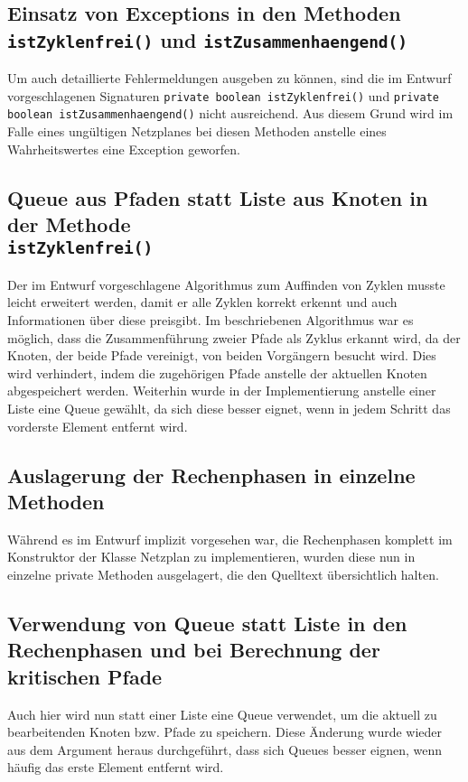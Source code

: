 \subsection{Einsatz von Exceptions in den Methoden
  \texttt{istZyklenfrei()} und \texttt{istZusammenhaengend()}}

Um auch detaillierte Fehlermeldungen ausgeben zu k\"onnen, sind die im
Entwurf vorgeschlagenen Signaturen \texttt{private boolean istZyklenfrei()}
und \texttt{private boolean istZusammenhaengend()} nicht
ausreichend. Aus diesem Grund wird im Falle eines ung\"ultigen
Netzplanes bei diesen Methoden anstelle eines Wahrheitswertes eine
Exception geworfen.

\subsection{Queue aus Pfaden statt Liste aus Knoten in der Methode\\
  \texttt{istZyklenfrei()}}

Der im Entwurf vorgeschlagene Algorithmus zum Auffinden von Zyklen
musste leicht erweitert werden, damit er alle Zyklen korrekt erkennt
und auch Informationen \"uber diese preisgibt. Im beschriebenen
Algorithmus war es m\"oglich, dass die Zusammenf\"uhrung zweier Pfade
als Zyklus erkannt wird, da der Knoten, der beide Pfade vereinigt, von
beiden Vorg\"angern besucht wird. Dies wird verhindert, indem die
zugeh\"origen Pfade anstelle der aktuellen Knoten abgespeichert
werden. Weiterhin wurde in der Implementierung anstelle einer Liste
eine Queue gew\"ahlt, da sich diese besser eignet, wenn in jedem
Schritt das vorderste Element entfernt wird.

\subsection{Auslagerung der Rechenphasen in einzelne Methoden}

W\"ahrend es im Entwurf implizit vorgesehen war, die Rechenphasen
komplett im Konstruktor der Klasse Netzplan zu implementieren, wurden
diese nun in einzelne private Methoden ausgelagert, die den Quelltext
\"ubersichtlich halten.

\subsection{Verwendung von Queue statt Liste in den Rechenphasen und
  bei Berechnung der kritischen Pfade}

Auch hier wird nun statt einer Liste eine Queue
verwendet, um die aktuell zu bearbeitenden Knoten bzw. Pfade zu
speichern. Diese
\"Anderung wurde wieder aus dem Argument heraus durchgef\"uhrt, dass
sich Queues besser eignen, wenn h\"aufig das erste Element entfernt
wird.

